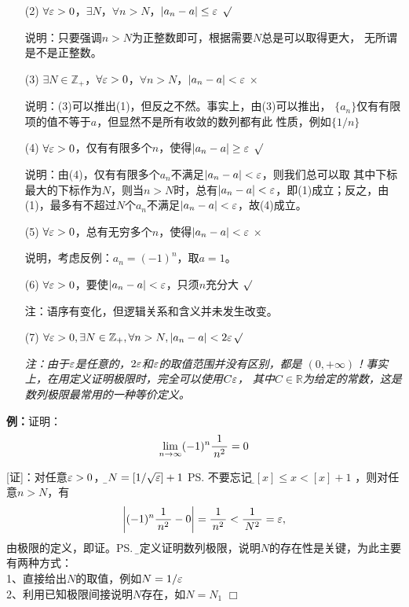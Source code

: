 \begin{enumerate}
  \setlength{\itemindent}{1cm}
  \item[(2)] $\forall\varepsilon>0$，$\exists N$，$\forall
  n>N$，$|a_n-a|\leq\varepsilon$ \hfill{$\surd$} 
  
  \quad 说明：只要强调$n>N$为正整数即可，根据需要$N$总是可以取得更大，
  无所谓是不是正整数。
  \item[(3)] $\exists N\in\mathbb{Z}_+$，$\forall\varepsilon>0$，$\forall
  n>N$，$|a_n-a|<\varepsilon$ \hfill{$\times$}
  
  \quad 说明：(3)可以推出(1)，但反之不然。事实上，由(3)可以推出，
  $\{a_n\}$仅有有限项的值不等于$a$，但显然不是所有收敛的数列都有此
  性质，例如$\{1/n\}$
  \item[(4)] $\forall\varepsilon>0$，仅有有限多个$n$，使得$|a_n-a|\geq\varepsilon$
  \hfill{$\surd$}
  
  \quad 说明：由(4)，仅有有限多个$a_n$不满足$|a_n-a|<\varepsilon$，则我们总可以取
  其中下标最大的下标作为$N$，则当$n>N$时，总有$|a_n-a|<\varepsilon$，即(1)成立；反之，由
  (1)，最多有不超过$N$个$a_n$不满足$|a_n-a|<\varepsilon$，故(4)成立。
  
  \item[(5)] $\forall\varepsilon>0$，总有无穷多个$n$，使得$|a_n-a|<\varepsilon$
  \hfill{$\times$} 
  
  \quad 说明，考虑反例：$a_n=(-1)^n$，取$a=1$。
  \item[(6)] $\forall\varepsilon>0$，要使$|a_n-a|<\varepsilon$，只须$n$充分大 \hfill{$\surd$}
  
  \quad 注：语序有变化，但逻辑关系和含义并未发生改变。
  \item[(7)] $\forall\varepsilon>0,\exists N\in\mathbb{Z}_+,\forall
  n>N,|a_n-a|<2\varepsilon$\hfill{$\surd$}
  
  {\quad\b\it 注：由于$\varepsilon$是任意的，$2\varepsilon$和$\varepsilon$的取值范围并没有区别，都是
  $(0,+\infty)$！事实上，在用定义证明极限时，完全可以使用$C\varepsilon$，
  其中$C\in\mathbb{R}$为给定的常数，这是数列极限最常用的一种等价定义。}
\end{enumerate}

{\bf 例：}证明：
$$\lim\limits_{n\to\infty}(-1)^n\displaystyle\frac{\,{1}\,}{\,{n^2}\,}=0$$

[证]：对任意$\varepsilon>0$，{\b 令$N=\left[1/\sqrt{\varepsilon}\right]+1$}
\ps{不要忘记：\b $[x]\leq x<[x]+1$}
，则对任意$n>N$，有
$$\left|(-1)^n\displaystyle\frac{\,{1}\,}{\,{n^2}\,}-0\right|=\displaystyle\frac{\,{1}\,}{\,{n^2}\,}<\displaystyle\frac{\,{1}\,}{\,{N^2}\,}=\varepsilon,$$
由极限的定义，即证。\ps{\b 用定义证明数列极限，说明$N$的存在性是关键，为此主要有两种方式：\\
1、直接给出$N$的取值，例如$N=1/\varepsilon$\\
2、利用已知极限间接说明$N$存在，如$N=N_1$}
\hfill $\Box$

